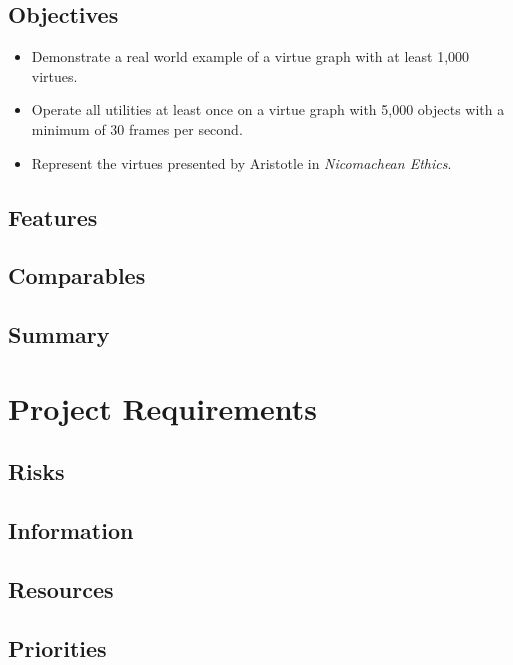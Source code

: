 \documentclass{article}
\begin{document}
\subsection{Objectives}

\begin{itemize}
    \item Demonstrate a real world example of a virtue graph with at least 1,000 virtues.
    \item Operate all utilities at least once on a virtue graph with 5,000 objects with a minimum of 30 frames per second.
    \item Represent the virtues presented by Aristotle in \textit{Nicomachean Ethics}.
\end{itemize}

\subsection{Features}


\subsection{Comparables}


\subsection{Summary}


\section{Project Requirements}

\subsection{Risks}


\subsection{Information}


\subsection{Resources}


\subsection{Priorities}

\end{document}
